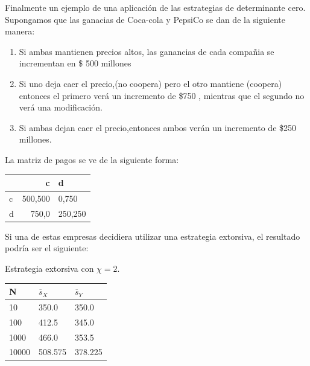 \documentclass[12pt]{article}
\begin{document}
Finalmente un ejemplo de una aplicación de las estrategias de determinante cero.
Supongamos que las ganacias de Coca-cola y PepsiCo se dan de la siguiente manera:
\begin{enumerate}
 \item Si ambas mantienen precios altos, las ganancias de cada compañia se incrementan
 en \$ 500 millones 
 \item Si uno deja caer el precio,(no coopera) pero el otro mantiene (coopera) entonces 
 el primero verá un incremento de \$750 , mientras que el segundo no verá una modificación.
 \item Si ambas dejan caer el precio,entonces ambos verán un incremento de \$250 millones.
\end{enumerate}
 
La matriz de pagos se ve de la siguiente forma:

\begin{tabular}{|l|r| l|}
  \hline   
     & c & d \\\hline
   c & 500,500 & 0,750 \\ \hline
   d & 750,0 & 250,250 \\  \hline  
\end{tabular} 

Si una de estas empresas decidiera utilizar una estrategia extorsiva, el resultado podría ser el
siguiente:

Estrategia extorsiva con $\chi=2$. 
\begin{center}
  \begin{tabular}{| l | l | l |}
    \hline
    N & $\overline s_X$ & $\overline s_Y$ \\\hline
    10 & 350.0 &350.0 \\\hline
    100 & 412.5 & 345.0 \\\hline
    1000 & 466.0 & 353.5 \\\hline
    10000 & 508.575 & 378.225 \\\hline    
  \end{tabular}
\end{center}
\end{document}
